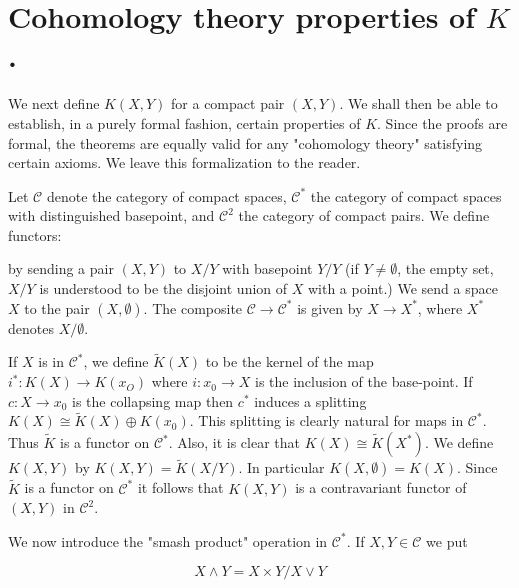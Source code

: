 \section{Cohomology theory properties of $K$.} We next define $K(X, Y)$ for a compact pair $(X, Y)$. We shall then be able to establish, in a purely formal fashion, certain properties of $K$. Since the proofs are formal, the theorems are equally valid for any "cohomology theory" satisfying certain axioms. We leave this formalization to the reader. \par 

Let $\mathcal{C}$ denote the category of compact spaces, $\mathcal{C}^*$ the category of compact spaces with distinguished basepoint, and $\mathcal{C}^2$ the category of compact pairs. We define functors:

\begin{center}
\end{center}

by sending a pair $(X, Y)$ to $X/Y$ with basepoint $Y/Y$ (if $Y \neq \emptyset$, the empty set, $X/Y$ is understood to be the disjoint union of $X$ with a point.) We send a space $X$ to the pair $(X, \emptyset)$. The composite $\mathcal{C} \to \mathcal{C}^*$ is given by $X \to X^*$, where $X^*$ denotes $X/\emptyset$. \par

If $X$ is in $\mathcal{C}^*$, we define $\tilde{K}(X)$ to be the kernel of the map $i^*: K(X) \to K(x_O)$ where $i: x_0 \to X$ is the inclusion of the base-point. If $c: X \to x_0$ is the collapsing map then $c^*$ induces a splitting $K(X) \cong \tilde{K}(X) \oplus K(x_0)$. This splitting is clearly natural for maps in $\mathcal{C}^*$. Thus $\tilde{K}$ is a functor on $\mathcal{C}^*$. Also, it is clear that $K(X) \cong \tilde{K}(X^*)$. We define $K(X, Y)$ by $K(X, Y) = \tilde{K}(X/Y)$. In particular $K(X, \emptyset) = K(X)$. Since $\tilde{K}$ is a functor on $\mathcal{C}^*$ it follows that $K(X, Y)$ is a contravariant functor of $(X, Y)$ in $\mathcal{C}^2$. \par 

We now introduce the "smash product" operation in $\mathcal{C}^*$. If $X, Y \in \mathcal{C}$ we put

\begin{equation*}
    X \wedge Y = X \times Y / X \vee Y
\end{equation*}

